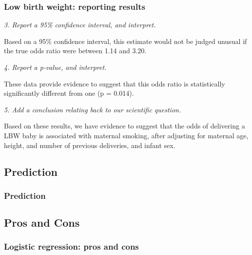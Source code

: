 \documentclass[12pt, 
hyperref={colorlinks=true, linkcolor=blue, urlcolor=cyan}]{beamer}
\begin{document}
\begin{frame}
\frametitle{Low birth weight: reporting results}
\textit{3. Report a 95\% confidence interval, and interpret.}

Based on a 95\% confidence interval, this estimate would not be judged unusual if the true odds ratio were between 1.14 and 3.20. \pause

\textit{4. Report a p-value, and interpret.}

These data provide evidence to suggest that this odds ratio is statistically significantly different from one (p = 0.014). \pause

\textit{5. Add a conclusion relating back to our scientific question.}

Based on these results, we have evidence to suggest that the odds of delivering a LBW baby is associated with maternal smoking, after adjusting for maternal age, height, and number of previous deliveries, and infant sex.

\end{frame}


\subsection{Prediction}
\begin{frame}
\frametitle{Prediction}


\end{frame}

\subsection{Pros and Cons}
\begin{frame}
\frametitle{Logistic regression: pros and cons}
\end{frame}
\end{document}
